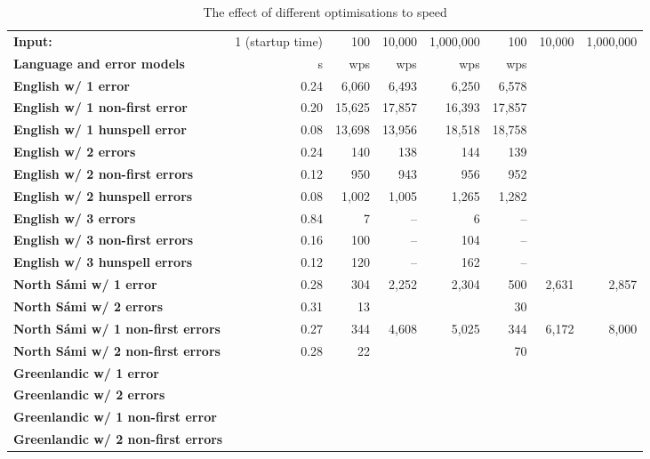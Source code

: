 \documentclass[a4paper,12pt]{article}
\begin{document}
\begin{table}
    \centering
    \begin{tabular}{|l|r||r|r|r||r|r|r|}
        \hline
        \bf Input: & 1 (startup time) & 100 & 10,000 & 1,000,000 & 100 & 10,000 & 1,000,000 \\
        \bf Language and error models & s   & wps   & wps        & wps & wps    &           \\
        \hline
        \bf English w/ 1 error     & 0.24  & 6,060  & 6,493  & 6,250  & 6,578 \\
 \bf English w/ 1 non-first error  & 0.20  & 15,625 & 17,857 & 16,393 & 17,857  \\
 \bf English w/ 1 hunspell error   & 0.08  & 13,698 & 13,956 & 18,518 & 18,758  \\
     \bf English w/ 2 errors       & 0.24  & 140   & 138   & 144   & 139  \\
 \bf English w/ 2 non-first errors & 0.12  & 950   & 943   & 956   & 952 \\
 \bf English w/ 2 hunspell errors  & 0.08  & 1,002 & 1,005 & 1,265 & 1,282 \\
   \bf English w/ 3 errors         & 0.84  & 7    &  --  &    6 & -- \\
 \bf English w/ 3 non-first errors & 0.16  & 100  &  --  &  104 & -- \\
 \bf English w/ 3 hunspell errors  & 0.12  & 120  &  --  &  162 & -- \\
        \hline
        \bf North Sámi w/ 1 error & 0.28 & 304 & 2,252 & 2,304 & 500 & 2,631 & 2,857\\
       \bf North Sámi w/ 2 errors & 0.31 & 13 & & & 30 & & \\
        \bf North Sámi w/ 1 non-first errors & 0.27 & 344 & 4,608 & 5,025 & 344 & 6,172 & 8,000 \\
        \bf North Sámi w/ 2 non-first errors & 0.28 & 22 & & & 70 & &  \\
        \hline
        \bf Greenlandic w/ 1 error & & & & & \\
       \bf Greenlandic w/ 2 errors & & & & & \\
        \bf Greenlandic w/ 1 non-first error & & & & & \\
       \bf Greenlandic w/ 2 non-first errors & & & & & \\
        \hline
    \end{tabular}
    \caption{The effect of different optimisations to speed
    \label{table:optimisation-speed}}
\end{table}
\end{document}
